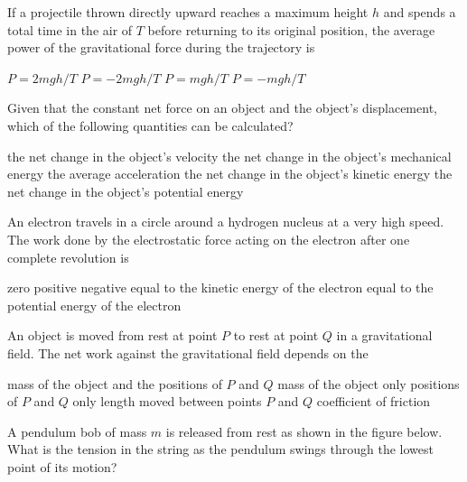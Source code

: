 \documentclass{../../../oss-ap12ibhl-print}
\begin{document}
\begin{questions}
  \question If a projectile thrown directly upward reaches a maximum height $h$
  and spends a total time in the air of $T$ before returning to its original
  position, the average power of the gravitational force during the trajectory
  is
  \begin{choices}
    \choice $P=2mgh/T$
    \choice $P=-2mgh/T$
    \choice $P=mgh/T$
    \choice $P=-mgh/T$
  \end{choices}
    
  \question Given that the constant net force on an object and the object's 
  displacement, which of the following quantities can be calculated?
  \begin{choices}
    \choice the net change in the object's velocity
    \choice the net change in the object's mechanical energy
    \choice the average acceleration
    \choice the net change in the object's kinetic energy
    \choice the net change in the object's potential energy
  \end{choices}
    
  \question An electron travels in a circle around a hydrogen nucleus at a very
  high speed. The work done by the electrostatic force acting on the electron
  after one complete revolution is
  \begin{choices}
    \choice zero
    \choice positive
    \choice negative
    \choice equal to the kinetic energy of the electron
    \choice equal to the potential energy of the electron
  \end{choices}
    
  \question An object is moved from rest at point $P$ to rest at point $Q$ in a
  gravitational field. The net work against the gravitational field depends
  on the
  \begin{choices}
    \choice mass of the object and the positions of $P$ and $Q$
    \choice mass of the object only
    \choice positions of $P$ and $Q$ only
    \choice length moved between points $P$ and $Q$
    \choice coefficient of friction
  \end{choices}
    
  \question A pendulum bob of mass $m$ is released from rest as shown in the
  figure below. What is the tension in the string as the pendulum swings
  through the lowest point of its motion?


\end{questions}
\end{document}
